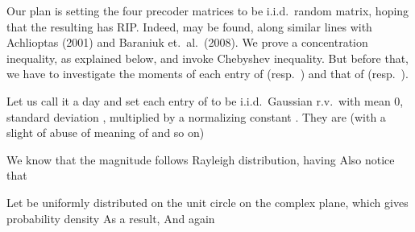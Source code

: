 \startsection [title={Confirming Restricted Isometry of Beamformer}]
\startsubsection [title={Design of Beamformer entries}]

Our plan is setting the four precoder matrices to be i.i.d.\ random matrix, hoping that the resulting  has RIP.
Indeed,  may be found, along similar lines with Achlioptas (2001) and Baraniuk et.\ al.\ (2008).
We prove a concentration inequality, as explained below, and invoke Chebyshev inequality.
But before that, we have to investigate the moments of each entry of  (resp.\ ) and that of  (resp.\ ).

Let us call it a day and set each entry of  to be i.i.d.\ Gaussian r.v.\ with mean 0, standard deviation , multiplied by a normalizing constant .
They are (with a slight of abuse of meaning of  and so on)

We know that the magnitude  follows Rayleigh distribution, having
Also notice that

Let  be uniformly distributed on the unit circle on the complex plane, which gives probability density
As a result,
And again


